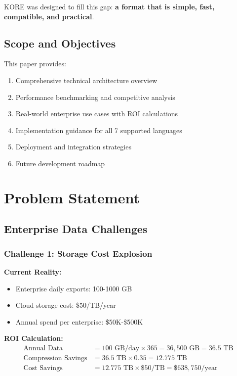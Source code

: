 \documentclass[12pt,a4paper]{report}
\begin{document}
KORE was designed to fill this gap: \textbf{a format that is simple, fast, compatible, and practical}.

\section{Scope and Objectives}

This paper provides:

\begin{enumerate}
    \item Comprehensive technical architecture overview
    \item Performance benchmarking and competitive analysis
    \item Real-world enterprise use cases with ROI calculations
    \item Implementation guidance for all 7 supported languages
    \item Deployment and integration strategies
    \item Future development roadmap
\end{enumerate}

\chapter{Problem Statement}

\section{Enterprise Data Challenges}

\subsection{Challenge 1: Storage Cost Explosion}

\textbf{Current Reality:}
\begin{itemize}
    \item Enterprise daily exports: 100-1000 GB
    \item Cloud storage cost: \$50/TB/year
    \item Annual spend per enterprise: \$50K-\$500K
\end{itemize}

\textbf{ROI Calculation:}
\begin{align}
\text{Annual Data} &= 100 \text{ GB/day} \times 365 = 36,500 \text{ GB} = 36.5 \text{ TB} \\
\text{Compression Savings} &= 36.5 \text{ TB} \times 0.35 = 12.775 \text{ TB} \\
\text{Cost Savings} &= 12.775 \text{ TB} \times \$50/\text{TB} = \$638,750/\text{year}
\end{align}
\end{document}
